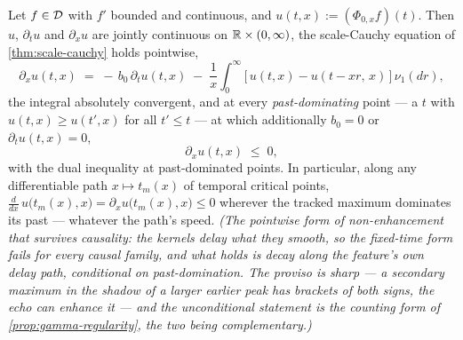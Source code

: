 \begin{corollary}\label{cor:past-dominating}
Let $f \in \mathcal{D}$ with $f'$ bounded and continuous, and $u(t, x) := (\Phi_{0,x}f)(t)$. Then
$u$, $\partial_t u$ and $\partial_x u$ are jointly continuous on $\mathbb{R} \times (0,\infty)$,
the scale-Cauchy equation of \ref{thm:scale-cauchy} holds pointwise,
\[
  \partial_x u(t, x)
  \;=\; -\,b_0\,\partial_t u(t, x)
  \;-\; \frac{1}{x}\int_0^\infty \bigl[\,u(t, x) - u(t - xr,\, x)\,\bigr]\,\nu_1(dr),
\]
the integral absolutely convergent, and at every \emph{past-dominating} point --- a $t$ with
$u(t, x) \ge u(t', x)$ for all $t' \le t$ --- at which additionally $b_0 = 0$ or
$\partial_t u(t, x) = 0$,
\[
  \partial_x u(t, x) \;\le\; 0 ,
\]
with the dual inequality at past-dominated points. In particular, along any differentiable
path $x \mapsto t_m(x)$ of temporal critical points,
$\tfrac{d}{dx}\,u\bigl(t_m(x), x\bigr) = \partial_x u\bigl(t_m(x), x\bigr) \le 0$ wherever
the tracked maximum dominates its past --- whatever the path's speed.
\statusT\quad\emph{(The pointwise form of non-enhancement that survives causality: the
kernels delay what they smooth, so the fixed-time form fails for every causal family, and
what holds is decay along the feature's own delay path, conditional on past-domination.
The proviso is sharp --- a secondary maximum in the shadow of a larger earlier peak has
brackets of both signs, the echo can enhance it --- and the unconditional statement is the
counting form of \ref{prop:gamma-regularity}, the two being complementary.)}
\end{corollary}

